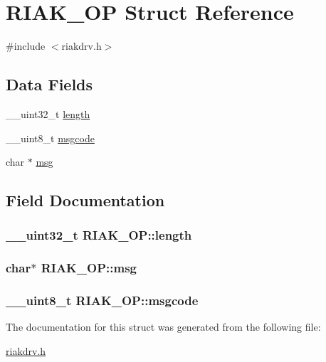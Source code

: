 \hypertarget{structRIAK__OP}{
\section{RIAK\_\-OP Struct Reference}
\label{structRIAK__OP}
}


{\ttfamily \#include $<$riakdrv.h$>$}

\subsection*{Data Fields}
\begin{DoxyCompactItemize}
\item 
\_\-\_\-uint32\_\-t \hyperlink{structRIAK__OP_ad9a9ebef38f4c35c0cb13f331bb817b8}{length}
\item 
\_\-\_\-uint8\_\-t \hyperlink{structRIAK__OP_abde5e88f658ba818a8b083d8927fc59f}{msgcode}
\item 
char $\ast$ \hyperlink{structRIAK__OP_ab3584d73e5c9a8486ee78b239a35d151}{msg}
\end{DoxyCompactItemize}


\subsection{Field Documentation}
\hypertarget{structRIAK__OP_ad9a9ebef38f4c35c0cb13f331bb817b8}{
\subsubsection[{length}]{\setlength{\rightskip}{0pt plus 5cm}\_\-\_\-uint32\_\-t {\bf RIAK\_\-OP::length}}}
\label{structRIAK__OP_ad9a9ebef38f4c35c0cb13f331bb817b8}
\hypertarget{structRIAK__OP_ab3584d73e5c9a8486ee78b239a35d151}{
\subsubsection[{msg}]{\setlength{\rightskip}{0pt plus 5cm}char$\ast$ {\bf RIAK\_\-OP::msg}}}
\label{structRIAK__OP_ab3584d73e5c9a8486ee78b239a35d151}
\hypertarget{structRIAK__OP_abde5e88f658ba818a8b083d8927fc59f}{
\subsubsection[{msgcode}]{\setlength{\rightskip}{0pt plus 5cm}\_\-\_\-uint8\_\-t {\bf RIAK\_\-OP::msgcode}}}
\label{structRIAK__OP_abde5e88f658ba818a8b083d8927fc59f}


The documentation for this struct was generated from the following file:\begin{DoxyCompactItemize}
\item 
\hyperlink{riakdrv_8h}{riakdrv.h}\end{DoxyCompactItemize}

